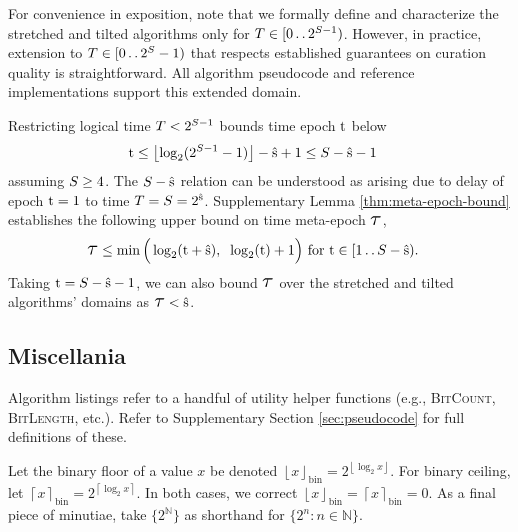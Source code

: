For convenience in exposition, note that we formally define and characterize the stretched and tilted algorithms only for $\colorT \in [0 \twodots 2^{\colorS - 1})$.
However, in practice, extension to $\colorT \in [0 \twodots 2^{\colorS} - 1)$ that respects established guarantees on curation quality is straightforward.
All algorithm pseudocode and reference implementations support this extended domain.

Restricting logical time $\colorT < 2^{\colorS - 1}$ bounds time epoch $\colort$ below
\begin{align*}
\colort &\leq \left\lfloor\log_2(2^{\colorS - 1} - 1)\right\rfloor - \colors + 1
\leq \colorS - \colors - 1
\end{align*}
assuming $\colorS \geq 4$.
The $\colorS - \colors$ relation can be understood as arising due to delay of epoch $\colort=1$ to time $\colorT = \colorS = 2^{\colors}$.
Supplementary Lemma \ref{thm:meta-epoch-bound} establishes the following upper bound on time meta-epoch $\colortau$,
\begin{align*}
\colortau
&\leq
\min\Big(
  \log_2(\colort + \colors),\;\;
  \log_2(\colort) + 1
\Big)
\text{ for } \colort \in [1 \twodots \colorS - \colors).
\end{align*}
Taking $\colort = \colorS - \colors - 1$, we can also bound $\colortau$ over the stretched and tilted algorithms' domains as $\colortau < \colors$.

\subsection{Miscellania}

Algorithm listings refer to a handful of utility helper functions (e.g., \textsc{BitCount}, \textsc{BitLength}, etc.).
Refer to Supplementary Section \ref{sec:pseudocode} for full definitions of these.

Let the binary floor of a value $x$ be denoted $\left\lfloor x \right\rfloor_\mathrm{bin} = 2^{\left\lfloor \log_2 x \right\rfloor}$.
For binary ceiling, let $\left\lceil x \right\rceil_\mathrm{bin} = 2^{\left\lceil \log_2 x \right\rceil}$.
In both cases, we correct $\left\lfloor x \right\rfloor_\mathrm{bin} = \left\lceil x \right\rceil_\mathrm{bin} = 0$.
As a final piece of minutiae, take $\{2^{\mathbb{N}}\}$ as shorthand for $\{2^n : n \in \mathbb{N} \}$.
